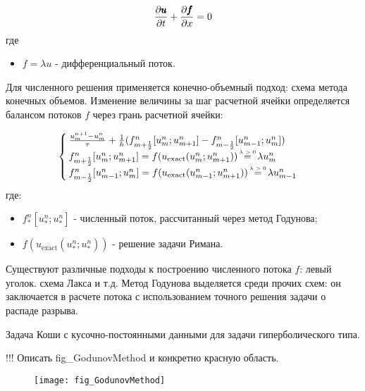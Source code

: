 \begin{equation}
	\frac{\partial \pmb{u}}{\partial t} + \frac{\partial \pmb{f}}{\partial x} = 0\\
\end{equation}
где
\begin{itemize}
	\item $f = \lambda u$ - дифференциальный поток.
\end{itemize}

Для численного решения применяется конечно-объемный подход: схема метода конечных объемов. Изменение величины за шаг расчетной ячейки определяется балансом потоков $f$ через грань расчетной ячейки:

\begin{equation}
	\begin{cases}
		\frac{u^{n+1}_{m} - u^{n}_{m}}{\tau} + \frac{1}{h} (f^{n}_{m+\frac{1}{2}}[u^{n}_{m}; u^{n}_{m+1}] - f^{n}_{m-\frac{1}{2}}[u^{n}_{m-1}; u^{n}_{m}])\\
		f^{n}_{m+\frac{1}{2}}[u^{n}_{m}; u^{n}_{m+1}] = f(u_{\text{exact}}(u^{n}_{m}; u^{n}_{m+1})) \ \lameq \ \lambda u^{n}_{m}\\
		f^{n}_{m-\frac{1}{2}}[u^{n}_{m-1}; u^{n}_{m}] = f(u_{\text{exact}}(u^{n}_{m-1}; u^{n}_{m+1})) \ \lameq \ \lambda u^{n}_{m-1}\\
	\end{cases}
\end{equation}
где:
\begin{itemize}
	\item $f^{n}_{*}[u^{n}_{*}; u^{n}_{*}]$ - численный поток, рассчитанный через метод Годунова;
	\item $f(u_{\text{exact}}(u^{n}_{*}; u^{n}_{*}))$ - решение задачи Римана.
\end{itemize}

Существуют различные подходы к построению численного потока $f$: левый уголок. схема Лакса и т.д. Метод Годунова выделяется среди прочих схем: он заключается в расчете потока с использованием точного решения задачи о распаде разрыва.

\begin{definition}
	Задача Коши с кусочно-постоянными данными для задачи гиперболического типа.
\end{definition}

\begin{example}
	!!! Описать fig\_GodunovMethod и конкретно красную область.
	
	\begin{figure}[h]
		\centering
		
		\texttt{[image: fig\_GodunovMethod]}
		\label{fig_GodunovMethod}
	\end{figure}
\end{example}

